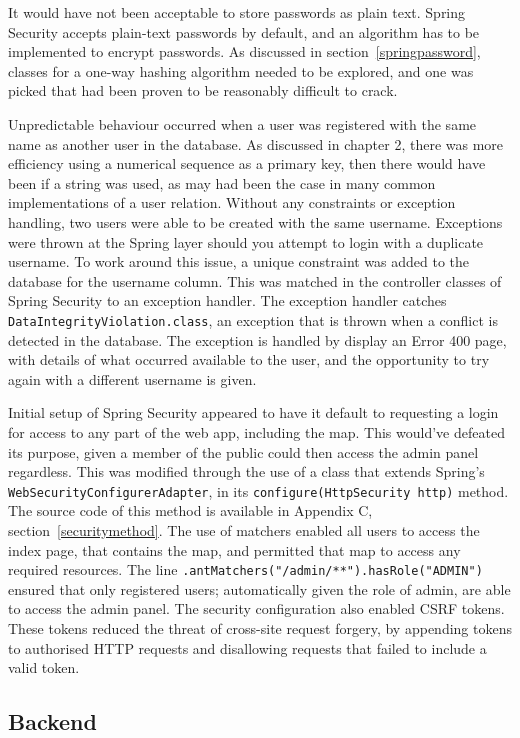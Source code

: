 It would have not been acceptable to store passwords as plain text. Spring Security accepts plain-text passwords by default, and an algorithm has to be implemented to encrypt passwords. As discussed in section~\ref{springpassword}, classes for a one-way hashing algorithm needed to be explored, and one was picked that had been proven to be reasonably difficult to crack.

Unpredictable behaviour occurred when a user was registered with the same name as another user in the database. As discussed in chapter 2, there was more efficiency using a numerical sequence as a primary key, then there would have been if a string was used, as may had been the case in many common implementations of a user relation. Without any constraints or exception handling, two users were able to be created with the same username. Exceptions were thrown at the Spring layer should you attempt to login with a duplicate username. To work around this issue, a unique constraint was added to the database for the username column. This was matched in the controller classes of Spring Security to an exception handler. The exception handler catches \texttt{DataIntegrityViolation.class}, an exception that is thrown when a conflict is detected in the database. The exception is handled by display an Error 400 page, with details of what occurred available to the user, and the opportunity to try again with a different username is given.

Initial setup of Spring Security appeared to have it default to requesting a login for access to any part of the web app, including the map. This would've defeated its purpose, given a member of the public could then access the admin panel regardless. This was modified through the use of a class that extends Spring's \texttt{WebSecurityConfigurerAdapter}, in its \texttt{configure(HttpSecurity http)} method. The source code of this method is available in Appendix C, section~\ref{securitymethod}. The use of matchers enabled all users to access the index page, that contains the map, and permitted that map to access any required resources. The line \texttt{.antMatchers("/admin/**").hasRole("ADMIN")} ensured that only registered users; automatically given the role of admin, are able to access the admin panel. The security configuration also enabled CSRF tokens. These tokens reduced the threat of cross-site request forgery, by appending tokens to authorised HTTP requests and disallowing requests that failed to include a valid token.
\newpage
\subsection{Backend}

